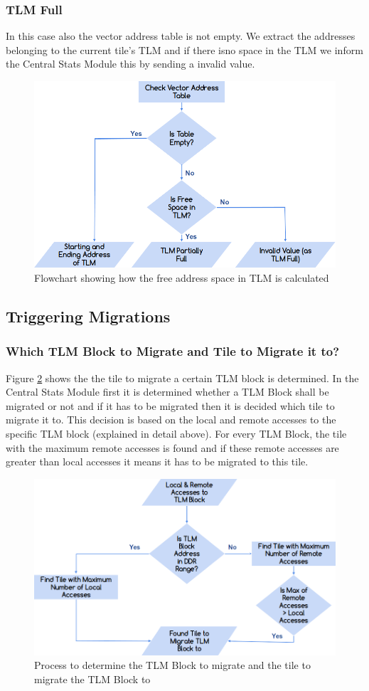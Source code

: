 \documentclass{listhesis}
\begin{document}
\subsubsection{TLM Full}
In this case also the vector address table is not empty. We extract the addresses belonging to the current tile's TLM and if there isno space in the TLM we inform the Central Stats Module this by sending a invalid value.\\
\begin{figure}
  \includegraphics[width=\linewidth]{freespace.png}
  \centering
  \caption{Flowchart showing how the free address space in TLM is calculated}
  \label{fig:freeSpaceTLM}
\end{figure}
\subsection{Triggering Migrations}
\subsubsection{Which TLM Block to Migrate and Tile to Migrate it to?}
Figure \ref{fig:tiletomigrate} shows the the tile to migrate a certain TLM block is determined. In the Central Stats Module first it is determined whether a TLM Block shall be migrated or not and if it has to be migrated then it is decided which tile to migrate it to. This decision is based on the local and remote accesses to the specific TLM block (explained in detail above). For every TLM Block, the tile with the maximum remote accesses is found and if these remote accesses are greater than local accesses it means it has to be migrated to this tile.\\
\begin{figure}
  \includegraphics[width=0.4\linewidth]{tiletomigrate.png}
  \centering
  \caption{Process to determine the TLM Block to migrate and the tile to migrate the TLM Block to}
  \label{fig:tiletomigrate}
\end{figure}
\end{document}
